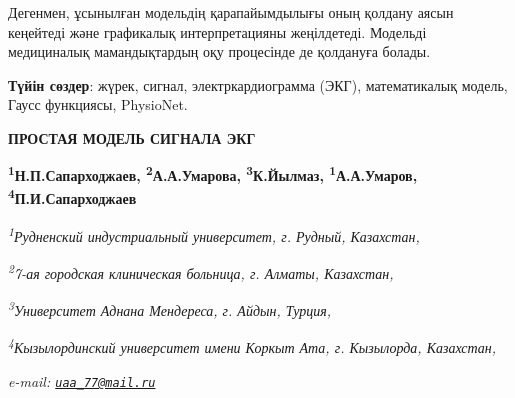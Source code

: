 \documentclass[
]{article}
\begin{document}
Дегенмен, ұсынылған модельдің қарапайымдылығы оның қолдану аясын
кеңейтеді және графикалық интерпретацияны жеңілдетеді. Модельді
медициналық мамандықтардың оқу процесінде де қолдануға болады.

\textbf{Түйін сөздер}: жүрек, сигнал, электркардиограмма (ЭКГ),
математикалық модель, Гаусс функциясы, PhysioNet.

\textbf{ПРОСТАЯ МОДЕЛЬ СИГНАЛА ЭКГ}

\textbf{\textsuperscript{1}Н.П.Сапарходжаев,
\textsuperscript{2}А.А.Умарова, \textsuperscript{3}К.Йылмаз,
\textsuperscript{1}А.А.Умаров, \textsuperscript{4}П.И.Сапарходжаев}

\emph{\textsuperscript{1}Рудненский индустриальный университет, г.
Рудный, Казахстан,}

\emph{\textsuperscript{2}7-ая городская клиническая больница, г. Алматы,
Казахстан,}

\emph{\textsuperscript{3}Университет Аднана Мендереса, г. Айдын,
Турция,}

\emph{\textsuperscript{4}Кызылординский университет имени Коркыт Ата, г.
Кызылорда, Казахстан,}

\emph{e-mail: \href{mailto:uaa_77@mail.ru}{\nolinkurl{uaa\_77@mail.ru}}}
\end{document}
